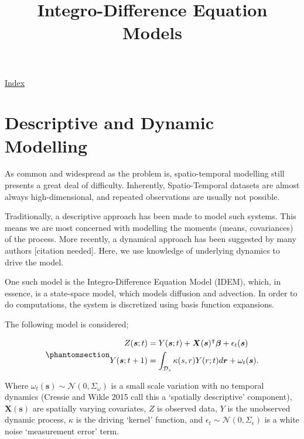 \documentclass[
  letterpaper,
  DIV=11,
  numbers=noendperiod]{scrartcl}
\title{Integro-Difference Equation Models}
\author{}
\date{}
\begin{document}
\maketitle


\href{./index.html}{Index}

\DeclareMathOperator{\var}{\mathbb{V}\mathrm{ar}}
\DeclareMathOperator{\cov}{\mathbb{C}\mathrm{ov}}
\renewcommand*{\vec}[1]{\boldsymbol{\mathbf{#1}}}

\section{Descriptive and Dynamic
Modelling}\label{descriptive-and-dynamic-modelling}

As common and widespread as the problem is, spatio-temporal modelling
still presents a great deal of difficulty. Inherently, Spatio-Temporal
datasets are almost always high-dimensional, and repeated observations
are usually not possible.

Traditionally, a descriptive approach has been made to model such
systems. This means we are most concerned with modelling the moments
(means, covariances) of the process. More recently, a dynamical approach
has been suggested by many authors {[}citation needed{]}. Here, we use
knowledge of underlying dynamics to drive the model.

One such model is the Integro-Difference Equation Model (IDEM), which,
in essence, is a state-space model, which models diffusion and
advection. In order to do computations, the system is discretized using
basis function expansions.

The following model is considered;

\begin{equation}\phantomsection\label{eq-IDEM}{
\begin{split}
Z(\boldsymbol s;t) &= Y(\boldsymbol s;t) + \boldsymbol X(\boldsymbol s)^{\intercal}\boldsymbol \beta + \epsilon_t(\boldsymbol s)\\
Y(\boldsymbol s;t+1) &= \int_{\mathcal D_s} \kappa(s,r) Y(r;t) d\boldsymbol r + \omega_t(\boldsymbol s). 
\end{split}
}\end{equation}

Where \(\omega_t(\boldsymbol s)\sim \mathcal N(0, \Sigma_\omega)\) is a
small scale variation with no temporal dynamics (Cressie and Wikle 2015
call this a `spatially descriptive' component),
\(\boldsymbol X(\boldsymbol s)\) are spatially varying covariates, \(Z\)
is observed data, \(Y\) is the unobserved dynamic process, \(\kappa\) is
the driving `kernel' function, and
\(\epsilon_t\sim \mathcal N(0, \Sigma_\epsilon)\) is a white noise
`measurement error' term.
\end{document}

